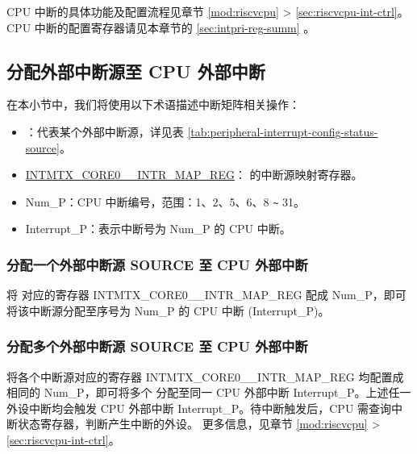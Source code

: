 \documentclass[main\_\_CN.tex]{subfiles}
\begin{document}
\begin{tiplisting}
CPU 中断的具体功能及配置流程见章节 \ref{mod:riscvcpu} \textit{} >  \ref{sec:riscvcpu-int-ctrl}\textit{}。CPU 中断的配置寄存器请见本章节的 \ref{sec:intpri-reg-summ} \textit{}。
\end{tiplisting}
\vspace{-1em}






\subsection{分配外部中断源至 CPU 外部中断}

在本小节中，我们将使用以下术语描述中断矩阵相关操作：

\begin{itemize}

\item {}：代表某个外部中断源，详见表 \ref{tab:peripheral-interrupt-config-status-source}。
\item \hyperref[INTMTXCORE0SOURCEINTRMAPREG]{INTMTX\_CORE0\_\_INTR\_MAP\_REG}： 的中断源映射寄存器。
\item Num\_P：CPU 中断编号，范围：1、2、5、6、8 \verb+~+ 31。
\item Interrupt\_P：表示中断号为 Num\_P 的 CPU 中断。

\end{itemize}

\subsubsection{分配一个外部中断源 SOURCE 至 CPU 外部中断}

将  对应的寄存器 INTMTX\_CORE0\_\_INTR\_MAP\_REG 配成 Num\_P，即可将该中断源分配至序号为 Num\_P 的 CPU 中断 (Interrupt\_P)。

\subsubsection{分配多个外部中断源 SOURCE 至 CPU 外部中断}

将各个中断源对应的寄存器 INTMTX\_CORE0\_\_INTR\_MAP\_REG 均配置成相同的 Num\_P，即可将多个  分配至同一 CPU 外部中断 Interrupt\_P。上述任一外设中断均会触发 CPU 外部中断 Interrupt\_P。待中断触发后，CPU 需查询中断状态寄存器，判断产生中断的外设。 更多信息，见章节 \ref{mod:riscvcpu} \textit{} >  \ref{sec:riscvcpu-int-ctrl}\textit{}。
\end{document}

